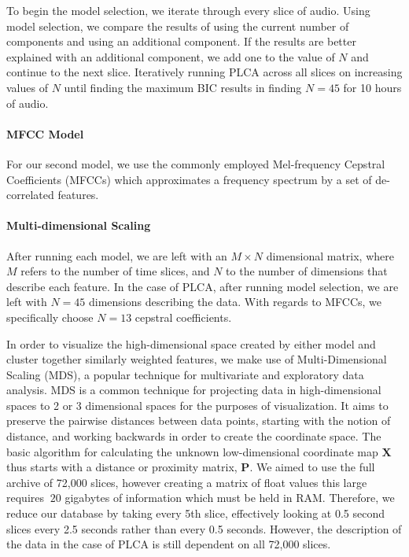 \documentclass[a4paper,10pt,final]{ThesisStyle}
\begin{document}
To begin the model selection, we iterate through every slice of audio.  Using model selection, we compare the results of using the current number of components and using an additional component.  If the results are better explained with an additional component, we add one to the value of $N$ and continue to the next slice. Iteratively running PLCA across all slices on increasing values of $N$ until finding the maximum BIC results in finding $N=45$ for 10 hours of audio.  

\paragraph{MFCC Model}
For our second model, we use the commonly employed Mel-frequency Cepstral Coefficients (MFCCs) which approximates a frequency spectrum by a set of de-correlated features.  

\paragraph{Multi-dimensional Scaling}
After running each model, we are left with an $M \times N$ dimensional matrix, where $M$ refers to the number of time slices, and $N$ to the number of dimensions that describe each feature.  In the case of PLCA, after running model selection, we are left with $N=45$ dimensions describing the data.  With regards to MFCCs, we specifically choose $N=13$ cepstral coefficients.  

In order to visualize the high-dimensional space created by either model and cluster together similarly weighted features, we make use of Multi-Dimensional Scaling (MDS), a popular technique for multivariate and exploratory data analysis. MDS is a common technique for projecting data in high-dimensional spaces to 2 or 3 dimensional spaces for the purposes of visualization.  It aims to preserve the pairwise distances between data points, starting with the notion of distance, and working backwards in order to create the coordinate space.  The basic algorithm for calculating the unknown low-dimensional coordinate map $\mathbf{X}$ thus starts with a distance or proximity matrix, $\mathbf{P}$.  We aimed to use the full archive of 72,000 slices, however creating a matrix of float values this large requires $~20$ gigabytes of information which must be held in RAM.  Therefore, we reduce our database by taking every 5th slice, effectively looking at 0.5 second slices every 2.5 seconds rather than every 0.5 seconds.  However, the description of the data in the case of PLCA is still dependent on all 72,000 slices.
  
\end{document}
